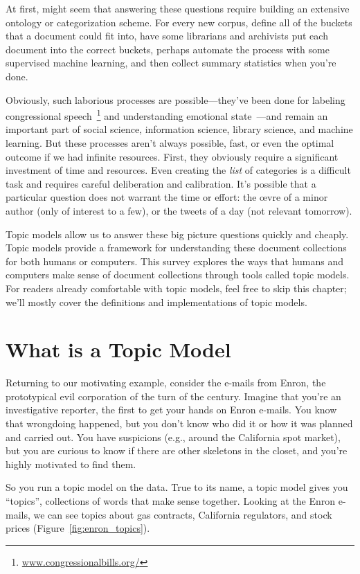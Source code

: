 At first, might seem that answering these questions require building an
extensive ontology or categorization scheme.  For every new corpus, define all
of the buckets that a document could fit into, have some librarians and
archivists put each document into the correct buckets, perhaps automate the
process with some supervised machine learning, and then collect summary
statistics when you're done.

Obviously, such laborious processes are possible---they've been done
for labeling congressional
speech~\footnote{\url{www.congressionalbills.org/}} and understanding
emotional state~\cite{wiebestates}---and remain an important part of
social science, information science, library science, and machine
learning.  But these processes aren't always possible, fast, or even
the optimal outcome if we had infinite resources.  First, they
obviously require a significant investment of time and resources.
Even creating the \emph{list} of categories is a difficult task and
requires careful deliberation and calibration.  It's possible that a
particular question does not warrant the time or effort: the \oe{}vre
of a minor author (only of interest to a few), or the tweets of a day
(not relevant tomorrow).

Topic models allow us to answer these big picture questions quickly and cheaply.
Topic models provide a framework for understanding these document collections
for both humans or computers.  This survey explores the ways that humans and
computers make sense of document collections through tools called topic models.
For readers already comfortable with topic models, feel free to skip this
chapter; we'll mostly cover the definitions and implementations of topic models.

\section{What is a Topic Model}

Returning to our motivating example, consider the e-mails from Enron, the prototypical
evil corporation of the turn of the century.  Imagine that you're an
investigative reporter, the first to get your hands on Enron e-mails.  You know
that wrongdoing happened, but you don't know who did it or how it was planned
and carried out.  You have suspicions (e.g., around the California spot market),
but you are curious to know if there are other skeletons in the closet, and
you're highly motivated to find them.

So you run a topic model on the data.  True to its name, a topic model
gives you ``topics'', collections of words that make sense together.
Looking at the Enron e-mails, we can see topics about gas contracts,
California regulators, and stock prices
(Figure~\ref{fig:enron_topics}).

